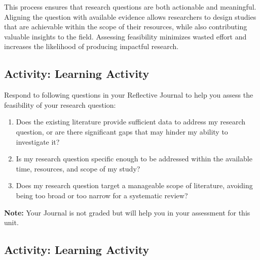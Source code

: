 \documentclass[
  letterpaper,
  DIV=11,
  numbers=noendperiod]{scrreprt}
\providecommand{\tightlist}{%
  \setlength{\itemsep}{0pt}\setlength{\parskip}{0pt}}\usepackage{longtable,booktabs,array}
\begin{document}
This process ensures that research questions are both actionable and
meaningful. Aligning the question with available evidence allows
researchers to design studies that are achievable within the scope of
their resources, while also contributing valuable insights to the field.
Assessing feasibility minimizes wasted effort and increases the
likelihood of producing impactful research.

\subsection*{Activity: Learning
Activity}\label{activity-learning-activity-10}

Respond to following questions in your Reflective Journal to help you
assess the feasibility of your research question:

\begin{enumerate}
\def\labelenumi{\arabic{enumi}.}
\tightlist
\item
  Does the existing literature provide sufficient data to address my
  research question, or are there significant gaps that may hinder my
  ability to investigate it?
\item
  Is my research question specific enough to be addressed within the
  available time, resources, and scope of my study?
\item
  Does my research question target a manageable scope of literature,
  avoiding being too broad or too narrow for a systematic review?
\end{enumerate}

\textbf{Note:} Your Journal is not graded but will help you in your
assessment for this unit.

\subsection*{Activity: Learning
Activity}\label{activity-learning-activity-11}
\end{document}
